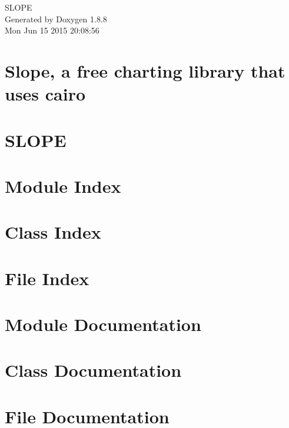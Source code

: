 \documentclass[twoside]{book}
\newcommand{\+}{\discretionary{\mbox{\scriptsize$\hookleftarrow$}}{}{}}
\newcommand{\clearemptydoublepage}{%
  \newpage{\pagestyle{empty}\cleardoublepage}%
}
\begin{document}
\hypersetup{pageanchor=false,
             bookmarks=true,
             bookmarksnumbered=true,
             pdfencoding=unicode
            }
\begin{titlepage}
\vspace*{7cm}
\begin{center}%
{\Large S\+L\+O\+P\+E }\\
\vspace*{1cm}
{\large Generated by Doxygen 1.8.8}\\
\vspace*{0.5cm}
{\small Mon Jun 15 2015 20:08:56}\\
\end{center}
\end{titlepage}
\clearemptydoublepage
\tableofcontents
\clearemptydoublepage
{}
\hypersetup{pageanchor=true}

\chapter{Slope, a free charting library that uses cairo}
\label{index}\hypertarget{index}{}
\chapter{S\+L\+O\+P\+E}
\label{md_README}
\hypertarget{md_README}{}

\chapter{Module Index}

\chapter{Class Index}

\chapter{File Index}

\chapter{Module Documentation}






\chapter{Class Documentation}



















\chapter{File Documentation}







\newpage
{}
{}
\printindex
\end{document}
